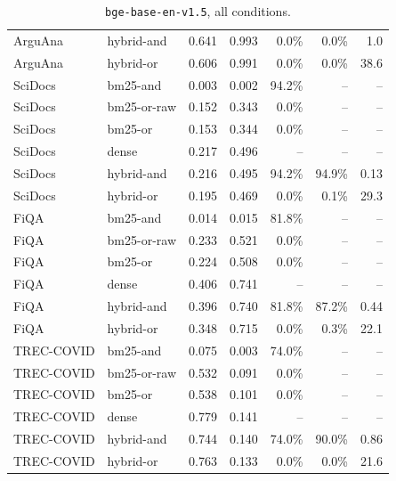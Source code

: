 \documentclass[11pt]{article}
\begin{document}
\begin{table}[p]
\begin{tabular}{llrrrrr}
ArguAna & hybrid-and & 0.641 & 0.993 & 0.0\% & 0.0\% & 1.0 \\
ArguAna & hybrid-or & 0.606 & 0.991 & 0.0\% & 0.0\% & 38.6 \\
\midrule
SciDocs & bm25-and & 0.003 & 0.002 & 94.2\% & -- & -- \\
SciDocs & bm25-or-raw & 0.152 & 0.343 & 0.0\% & -- & -- \\
SciDocs & bm25-or & 0.153 & 0.344 & 0.0\% & -- & -- \\
SciDocs & dense & 0.217 & 0.496 & -- & -- & -- \\
SciDocs & hybrid-and & 0.216 & 0.495 & 94.2\% & 94.9\% & 0.13 \\
SciDocs & hybrid-or & 0.195 & 0.469 & 0.0\% & 0.1\% & 29.3 \\
\midrule
FiQA & bm25-and & 0.014 & 0.015 & 81.8\% & -- & -- \\
FiQA & bm25-or-raw & 0.233 & 0.521 & 0.0\% & -- & -- \\
FiQA & bm25-or & 0.224 & 0.508 & 0.0\% & -- & -- \\
FiQA & dense & 0.406 & 0.741 & -- & -- & -- \\
FiQA & hybrid-and & 0.396 & 0.740 & 81.8\% & 87.2\% & 0.44 \\
FiQA & hybrid-or & 0.348 & 0.715 & 0.0\% & 0.3\% & 22.1 \\
\midrule
TREC-COVID & bm25-and & 0.075 & 0.003 & 74.0\% & -- & -- \\
TREC-COVID & bm25-or-raw & 0.532 & 0.091 & 0.0\% & -- & -- \\
TREC-COVID & bm25-or & 0.538 & 0.101 & 0.0\% & -- & -- \\
TREC-COVID & dense & 0.779 & 0.141 & -- & -- & -- \\
TREC-COVID & hybrid-and & 0.744 & 0.140 & 74.0\% & 90.0\% & 0.86 \\
TREC-COVID & hybrid-or & 0.763 & 0.133 & 0.0\% & 0.0\% & 21.6 \\
\bottomrule
\end{tabular}
\caption{\texttt{bge-base-en-v1.5}, all conditions.}
\label{tab:full-bge}
\end{table}
\end{document}
